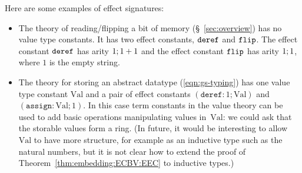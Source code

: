 \documentclass{LMCS}
\newcommand{\val}{\mathrm{Val}}
\newcommand{\geffreadcell}[1]{\codefont{deref}}
\newcommand{\geffwritecell}[1]{\codefont{assign}}
\newcommand{\codefont}[1]{\mathtt{#1}}
\newcommand{\co}{\colon}
\begin{document}
Here are some examples of effect signatures:
\begin{itemize}
\item The theory of reading/flipping a bit of memory (\S~\ref{sec:overview})
has no value type constants.
It has two effect constants, $\mathtt{deref}$ and $\mathtt{flip}$.
The effect constant $\mathtt{deref}$ has arity $1; 1+1$
and the effect constant $\mathtt{flip}$ has arity $1; 1$,
where $1$ is the empty string.
\item The theory for  storing an abstract datatype
(\ref{eqn:gs-typing})
has one value type constant $\val$
and a pair of effect constants
$(\geffreadcell{l} \co 1; \val)$ 
and
$(\geffwritecell{l} \co \val ; 1)$.
In this case term constants in the value theory can be used to add basic operations manipulating values in~$\val$:
we could ask that the storable values form a ring.
(In future, it would be interesting to allow $\val$ to
have more structure, for example as an inductive type such as the natural numbers,
but it is not clear how to extend the proof of 
Theorem~\ref{thm:embedding:ECBV:EEC} to inductive types.)
\end{itemize}
\end{document}
